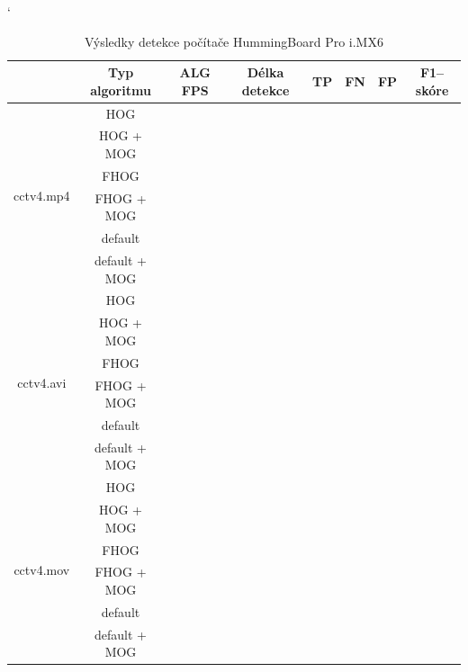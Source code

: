 \begin{table}[H]
\catcode`
\centering
\caption{Výsledky detekce počítače HummingBoard Pro i.MX6 }
\label{resultTabIMX}
\begin{tabular}{|c|c|c|c|c|c|c|c|}
\hline
                         & Typ algoritmu   	& ALG FPS & Délka detekce & TP & FN & FP & F1--skóre \\ \hline
\multirow{6}{*}{cctv4.mp4} & HOG        	&         &               &    &    &    &          \\ \cline{2-8} 
                         & HOG + MOG  		&         &               &    &    &    &          \\ \cline{2-8}  
                         & FHOG       		&         &               &    &    &    &          \\ \cline{2-8}  
                         & FHOG + MOG 		&         &               &    &    &    &          \\ \cline{2-8}  
                         & default	 		&         &               &    &    &    &          \\ \cline{2-8}  
                         & default + MOG	&         &               &    &    &    &          \\ \hline\hline 
\multirow{6}{*}{cctv4.avi} & HOG        	&         &               &    &    &    &          \\ \cline{2-8} 
                         & HOG + MOG  		&         &               &    &    &    &          \\ \cline{2-8}  
                         & FHOG       		&         &               &    &    &    &          \\ \cline{2-8} 
                         & FHOG + MOG 		&         &               &    &    &    &          \\ \cline{2-8} 
                         &  default 		&         &               &    &    &    &          \\ \cline{2-8}  
                         & default + MOG	&         &               &    &    &    &          \\ \hline \hline
\multirow{6}{*}{cctv4.mov} & HOG        	&         &               &    &    &    &          \\ \cline{2-8} 
                         & HOG + MOG  		&         &               &    &    &    &          \\ \cline{2-8} 
                         & FHOG       		&         &               &    &    &    &          \\ \cline{2-8}  
                         & FHOG + MOG 		&         &               &    &    &    &          \\ \cline{2-8} 
                         & default 		 	&         &               &    &    &    &          \\ \cline{2-8} 
                         & default + MOG 	&         &               &    &    &    &          \\ \hline
\end{tabular}
\end{table}


